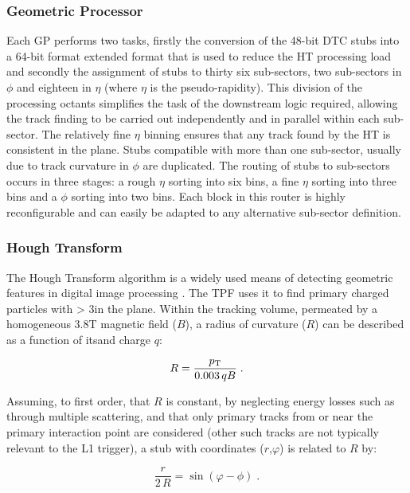 \subsubsection{Geometric Processor}\label{subsubsec:GP}
Each GP performs two tasks, firstly the conversion of the 48-bit DTC stubs into a 64-bit format extended format that is used to reduce the HT processing load and secondly the assignment of stubs to thirty six sub-sectors, two sub-sectors in $\phi$ and eighteen in $\eta$ (where $\eta$ is the pseudo-rapidity). 
This division of the processing octants simplifies the task of the downstream logic required, allowing the track finding to be carried out independently and in parallel within each sub-sector. 
The relatively fine $\eta$ binning ensures that any track found by the \rphi HT is consistent in the \rz plane. Stubs compatible with more than one sub-sector, usually due to track curvature in $\phi$ are duplicated. 
The routing of stubs to sub-sectors occurs in three stages: a rough $\eta$ sorting into six bins, a fine $\eta$ sorting into three bins and a $\phi$ sorting into two bins. 
Each block in this router is highly reconfigurable and can easily be adapted to any alternative sub-sector definition.

\subsubsection{Hough Transform}
The Hough Transform algorithm is a widely used means of detecting geometric features in digital image processing \cite{HT}. 
The TPF uses it to find primary charged particles with \pT > 3\GeV in the \rphi plane. 
Within the tracking volume, permeated by a homogeneous 3.8T magnetic field ($B$), a radius of curvature ($R$) can be described as a function of its\pT and charge $q$:

\begin{equation}
R = \frac{p_{\mathrm{T}}}{0.003\,qB} \;.
\label{eq:R}
\end{equation}

Assuming, to first order, that $R$ is constant, by neglecting energy losses such as through multiple scattering, and that only primary tracks from or near the primary interaction point are considered (other such tracks are not typically relevant to the L1 trigger), a stub with coordinates ($r$,$\varphi$) is related to $R$ by:

\begin{equation}
\frac r{2\,R} = \sin\left(\varphi-\phi\right) \;.
\label{eq:stub_R}
\end{equation}

